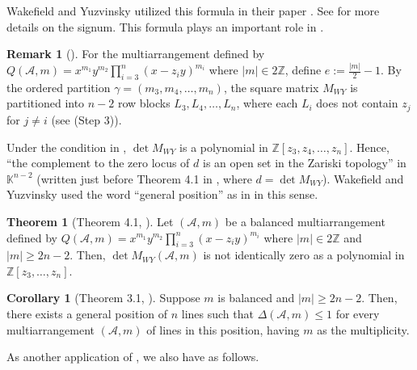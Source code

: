 \documentclass[12pt]{amsart}
\theoremstyle{definition}
\newtheorem{theorem}[definition]{Theorem}
\newtheorem{corollary}[definition]{Corollary}
\newtheorem{remark}[definition]{Remark}
\newcommand{\ZZ}{\mathbb{Z}}
\newcommand{\KK}{\mathbb{K}}
\newcommand{\AAA}{\mathcal{A}}
\begin{document}
Wakefield and Yuzvinsky utilized this formula 
in their paper \cite{Wakefield-Yuzvinsky}. 
See \cite{Wakefield-Yuzvinsky} for more details on the signum. 
This formula plays an important role %
in . 

\begin{remark}[\cite{Wakefield-Yuzvinsky}]\label{remark:partition}
For the multiarrangement defined by 
$Q(\AAA,m)=x^{m_1}y^{m_2}\prod_{i=3}^{n}(x-z_iy)^{m_i}$ where $|m|\in2\ZZ$, 
define $e:=\frac{|m|}{2}-1$. 
By the ordered partition $\gamma=(m_3,m_4,\ldots,m_n)$, %
the square matrix $M_{WY}$ is partitioned into 
$n-2$ row blocks $L_3,L_4,\ldots,L_n$, 
where  
%
each $L_i$ 
does not contain $z_j$ for $j\neq i$ %
(see (Step 3)). 
%
%
%
\end{remark}
%
Under the condition in , 
$\det M_{WY}$ is a polynomial in $\ZZ[z_3,z_4,\ldots,z_n]$. 
Hence, 
``the complement to the zero locus of $d$ is an open set in the Zariski topology'' 
in $\KK^{n-2}$ (written just before Theorem 4.1 in \cite{Wakefield-Yuzvinsky}, 
where $d=\det M_{WY}$). 
Wakefield and Yuzvinsky used the word ``general position'' as in 
 in this sense. %

\begin{theorem}[Theorem 4.1, \cite{Wakefield-Yuzvinsky}]
\label{theorem:main:Wakefield--Yuzvinsky}
    Let $(\AAA,m)$ be a balanced multiarrangement defined by 
    $Q(\AAA,m)=x^{m_1}y^{m_2}\prod_{i=3}^{n}(x-z_iy)^{m_i}$ 
    where $|m|\in2\ZZ$ and $|m|\geq2n-2$. 
    Then, $\det M_{WY}(\AAA,m)$ is not identically zero as a polynomial in $\ZZ[z_3,\ldots,z_n]$.
\end{theorem}
%
\begin{corollary}[Theorem 3.1, \cite{Wakefield-Yuzvinsky}]
\label{corollary:general position}
Suppose $m$ is balanced and $|m|\geq2n-2$. 
Then, there exists a general position of $n$ lines such that 
$\Delta(\AAA,m)\leq1$ 
for every multiarrangement $(\AAA,m)$ of lines in this position, 
having $m$ as the multiplicity. %
\end{corollary}
As another application of , 
we also have  as follows. 
\end{document}
